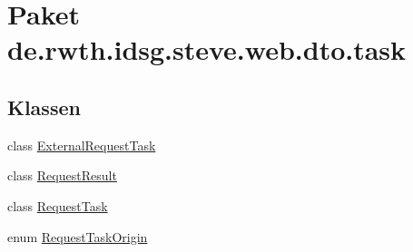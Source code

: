 \hypertarget{namespacede_1_1rwth_1_1idsg_1_1steve_1_1web_1_1dto_1_1task}{\section{Paket de.\+rwth.\+idsg.\+steve.\+web.\+dto.\+task}
\label{namespacede_1_1rwth_1_1idsg_1_1steve_1_1web_1_1dto_1_1task}
}
\subsection*{Klassen}
\begin{DoxyCompactItemize}
\item 
class \hyperlink{classde_1_1rwth_1_1idsg_1_1steve_1_1web_1_1dto_1_1task_1_1_external_request_task}{External\+Request\+Task}
\item 
class \hyperlink{classde_1_1rwth_1_1idsg_1_1steve_1_1web_1_1dto_1_1task_1_1_request_result}{Request\+Result}
\item 
class \hyperlink{classde_1_1rwth_1_1idsg_1_1steve_1_1web_1_1dto_1_1task_1_1_request_task}{Request\+Task}
\item 
enum \hyperlink{enumde_1_1rwth_1_1idsg_1_1steve_1_1web_1_1dto_1_1task_1_1_request_task_origin}{Request\+Task\+Origin}
\end{DoxyCompactItemize}
